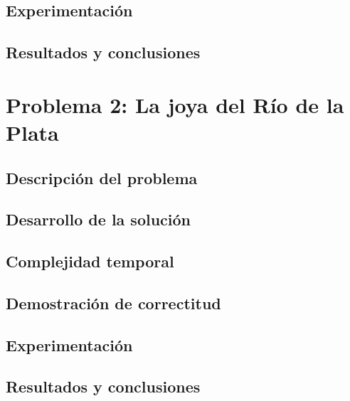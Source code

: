 \documentclass[a4paper, 10pt, twoside]{article}
\begin{document}
\subsection{Experimentación}


\subsection{Resultados y conclusiones}


\newpage



\section{Problema 2: La joya del Río de la Plata}

\subsection{Descripción del problema}


\subsection{Desarrollo de la solución}


\subsection{Complejidad temporal}


\subsection{Demostración de correctitud}
\label{problema2-demostracion}


\subsection{Experimentación}


\subsection{Resultados y conclusiones}

\end{document}
